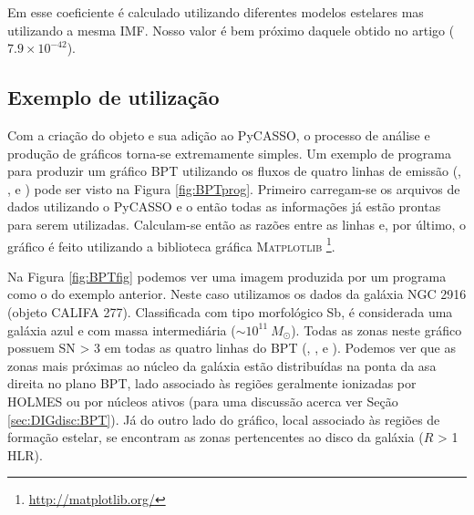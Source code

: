 Em \citet{Kennicutt.1998a} esse coeficiente é calculado utilizando diferentes modelos estelares mas utilizando a mesma IMF. Nosso valor é bem próximo daquele obtido no artigo ($7.9 \times 10^{-42}$).

\subsection{Exemplo de utilização}
\label{apendice:EmLinesDataCube:props:example}
Com a criação do objeto \emldc e sua adição ao PyCASSO, o processo de análise e produção de gráficos torna-se extremamente simples. Um exemplo de programa para produzir um gráfico BPT \citep{Baldwin.Phillips.Terlevich.1981a} utilizando os fluxos de quatro linhas de emissão (\Ha, \Hb, \oiii e \nii) pode ser visto na Figura \ref{fig:BPTprog}. Primeiro carregam-se os arquivos de dados utilizando o PyCASSO e o \emldc então todas as informações já estão prontas para serem utilizadas. Calculam-se então as razões entre as linhas e, por último, o gráfico é feito utilizando a biblioteca gráfica M\textsc{atplotlib} \footnote{\href{http://matplotlib.org/}{http://matplotlib.org/}}.

Na Figura \ref{fig:BPTfig} podemos ver uma imagem produzida por um programa como o do exemplo anterior. Neste caso utilizamos os dados da galáxia NGC 2916 (objeto CALIFA 277). Classificada com tipo morfológico Sb, é considerada uma galáxia azul e com massa intermediária ($\sim 10^{11}\ M_\odot$). Todas as zonas neste gráfico possuem SN > 3 em todas as quatro linhas do BPT (\Hb, \oiii, \Ha e \nii). Podemos ver que as zonas mais próximas ao núcleo da galáxia estão distribuídas na ponta da asa direita no plano BPT, lado associado às regiões geralmente ionizadas por HOLMES ou por núcleos ativos (para uma discussão acerca ver Seção \ref{sec:DIGdisc:BPT}). Já do outro lado do gráfico, local associado às regiões de formação estelar, se encontram as zonas pertencentes ao disco da galáxia ($R$ > 1 HLR).

